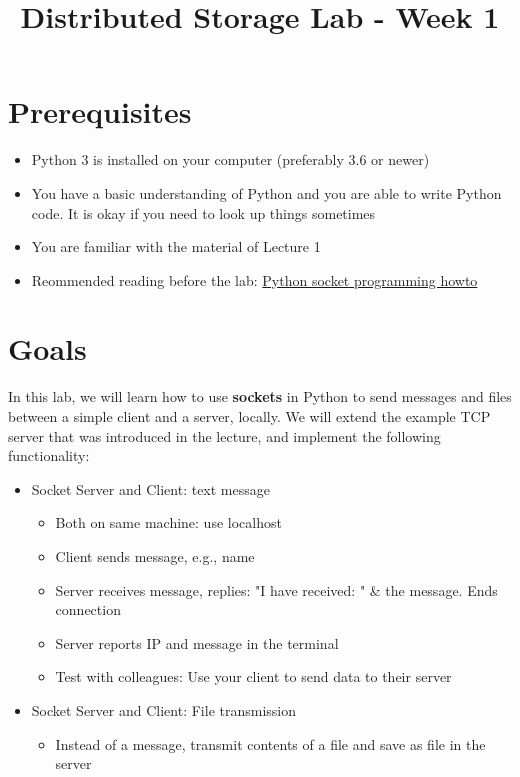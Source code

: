 

\title{Distributed Storage Lab - Week 1}





\maketitle

\section*{Prerequisites}
\begin{itemize}
\item Python 3 is installed on your computer (preferably 3.6 or newer)
\item You have a basic understanding of Python and you are able to write Python code. It is okay if you need to look up things sometimes
\item You are familiar with the material of Lecture 1
\item Reommended reading before the lab: \href{https://docs.python.org/3.7/howto/sockets.html}{Python socket programming howto}
\end{itemize}

\section{Goals}
In this lab, we will learn how to use \textbf{sockets} in Python to send messages and files between a simple client and a server, locally. We will extend the example TCP server that was introduced in the lecture, and implement the following functionality:

\begin{itemize}
\item Socket Server and Client: text message
  \begin{itemize}
  \item Both on same machine: use localhost
  \item Client sends message, e.g., name
  \item Server receives message, replies: "I have received: " \& the message. Ends connection
  \item Server reports IP and message in the terminal
  \item Test with colleagues: Use your client to send data to their server
  \end{itemize}
\item Socket Server and Client: File transmission
  \begin{itemize}
  \item Instead of a message, transmit contents of a file and save as file in the server
  \end{itemize}
\end{itemize}

